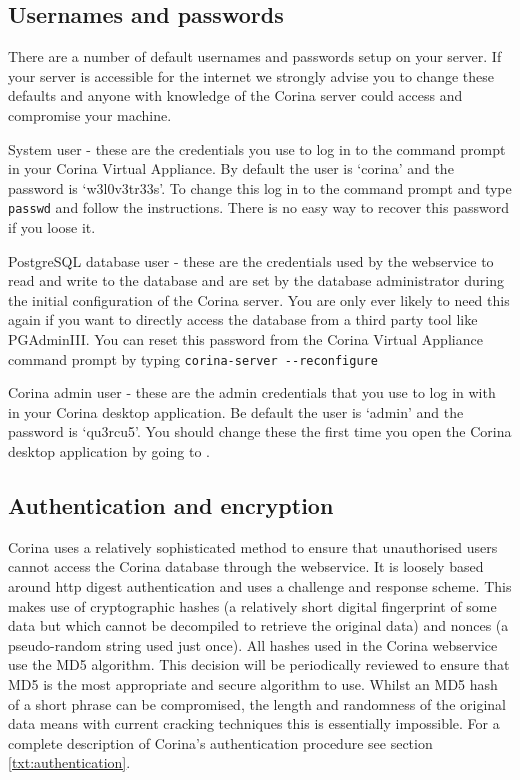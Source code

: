 \subsection{Usernames and passwords}
\label{txt:passwords}
There are a number of default usernames and passwords setup on your server.  If your server is accessible for the internet we strongly advise you to change these defaults and anyone with knowledge of the Corina server could access and compromise your machine.

\begin{description*}
 \item[System user] - these are the credentials you use to log in to the command prompt in your Corina Virtual Appliance.  By default the user is `corina' and the password is `w3l0v3tr33s'.  To change this log in to the command prompt and type \verb|passwd| and follow the instructions.  There is no easy way to recover this password if you loose it.
 \item[PostgreSQL database user] - these are the credentials used by the webservice to read and write to the database and are set by the database administrator during the initial configuration of the Corina server. You are only ever likely to need this again if you want to directly access the database from a third party tool like PGAdminIII.  You can reset this password from the Corina Virtual Appliance command prompt by typing \verb|corina-server --reconfigure|
 \item[Corina admin user] - these are the admin credentials that you use to log in with in your Corina desktop application.  Be default the user is `admin' and the password is `qu3rcu5'.  You should change these the first time you open the Corina desktop application by going to .
\end{description*}

\subsection{Authentication and encryption}
Corina uses a relatively sophisticated method to ensure that unauthorised users cannot access the Corina database through the webservice.  It is loosely based around http digest authentication and uses a challenge and response scheme.  This makes use of cryptographic hashes (a relatively short digital fingerprint of some data but which cannot be decompiled to retrieve the original data) and nonces (a pseudo-random string used just once). All hashes used in the Corina webservice use the MD5 algorithm. This decision will be periodically reviewed to ensure that MD5 is the most appropriate and secure algorithm to use. Whilst an MD5 hash of a short phrase can be compromised, the length and randomness of the original data means with current cracking techniques this is essentially impossible.   For a complete description of Corina's authentication procedure see section \ref{txt:authentication}.

